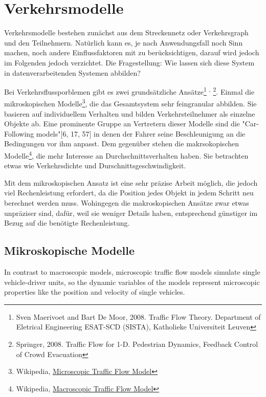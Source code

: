 \section{Verkehrsmodelle}

Verkehrsmodelle bestehen zunächst aus dem Streckennetz oder Verkehrsgraph und den Teilnehmern. Natürlich kann es, je nach Anwendungsfall noch Sinn machen, noch andere Einflussfaktoren mit zu berücksichtigen, darauf wird jedoch im Folgenden jedoch verzichtet. Die Fragestellung: Wie lassen sich diese System in datenverarbeitenden Systemen abbilden?

Bei Verkehrsflussporblemen gibt es zwei grundsätzliche Ansätze\footnote{Sven Maerivoet and Bart De Moor, 2008. Traffic Flow Theory. Department of Eletrical Engineering ESAT-SCD (SISTA), Katholieke Universiteit Leuven}
\textsuperscript{,}
\footnote{Springer, 2008. Traffic Flow for 1-D. Pedestrian Dynamics, Feedback Control of Crowd Evacuation}. Einmal die mikroskopischen Modelle\footnote{Wikipedia, \href{https://en.wikipedia.org/wiki/Microscopic\_traffic\_flow\_model}{Microscopic Traffic Flow Model}}, die das Gesamtsystem sehr feingranular abbilden. Sie basieren auf individuellem Verhalten und bilden Verkehrsteilnehmer als einzelne Objekte ab. Eine prominente Gruppe an Vertretern dieser Modelle sind die "Car-Following models"[6, 17, 57] in denen der Fahrer seine Beschleunigung an die Bedingungen vor ihm anpasst.
Dem gegenüber stehen die makrsokopischen Modelle\footnote{Wikipedia, \href{https://en.wikipedia.org/wiki/Macroscopic\_traffic\_flow\_model}{Macroscopic Traffic Flow Model}}, die mehr Interesse an Durchschnittsverhalten haben. Sie betrachten etwas wie Verkehrsdichte und Durschnittsgeschwindigkeit.

Mit dem mikroskopischen Ansatz ist eine sehr präzise Arbeit möglich, die jedoch viel Rechenleistung erfordert, da die Position jedes Objekt in jedem Schritt neu berechnet werden muss. Wohingegen die makroskopischen Ansätze zwar etwas unpräziser sind, dafür, weil sie weniger Details haben, entsprechend günstiger im Bezug auf die benötigte Rechenleistung.


\subsection*{Mikroskopische Modelle}
In contrast to macroscopic models, microscopic traffic flow models simulate single vehicle-driver units, so the dynamic variables of the models represent microscopic properties like the position and velocity of single vehicles.

